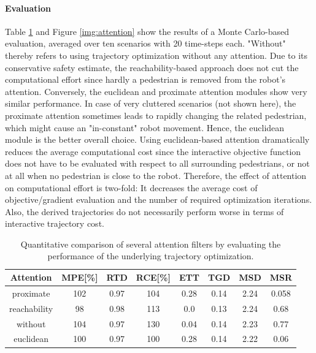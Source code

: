 \paragraph{Evaluation}
Table \ref{table:attention} and Figure \ref{img:attention} show the results of a Monte Carlo-based evaluation, averaged over ten scenarios with 20 time-steps each. "Without" thereby refers to using trajectory optimization without any attention. Due to its conservative safety estimate, the reachability-based approach does not cut the computational effort since hardly a pedestrian is removed from the robot's attention. Conversely, the euclidean and proximate attention modules show very similar performance. In case of very cluttered scenarios (not shown here), the proximate attention sometimes leads to rapidly changing the related pedestrian, which might cause an "in-constant" robot movement. Hence, the euclidean module is the better overall choice.
\newline
Using euclidean-based attention dramatically reduces the average computational cost since the interactive objective function does not have to be evaluated with respect to all surrounding pedestrians, or not at all when no pedestrian is close to the robot. Therefore, the effect of attention on computational effort is two-fold: It decreases the average cost of objective/gradient evaluation and the number of required optimization iterations. Also, the derived trajectories do not necessarily perform worse in terms of interactive trajectory cost. 

\begin{table}[!ht]
\begin{center}
\begin{tabular}{c|c|c|c|c|c|c|c}
\bf Attention & \bf MPE[\%] & \bf RTD & \bf RCE[\%] & \bf ETT & \bf TGD & \bf MSD & \bf MSR \\
\hline
proximate & 102 & 0.97 & 104 & 0.28 & 0.14 & 2.24 & 0.058 \\
\hline
reachability & 98 & 0.98 & 113 & 0.0 & 0.13 & 2.24 & 0.68 \\
\hline
\rowcolor{baseline_color}
without & 104 & 0.97 & 130 & 0.04 & 0.14 & 2.23 & 0.77 \\ 
\hline
\rowcolor{our_color}
euclidean & 100 & 0.97 & 100 & 0.28 & 0.14 & 2.22 & 0.06
\end{tabular}
\end{center}
\caption{Quantitative comparison of several attention filters by evaluating the performance of the underlying trajectory optimization.}
\label{table:attention}
\end{table}

